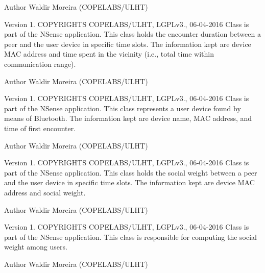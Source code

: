 \begin{DoxyAuthor}{Author}
Waldir Moreira (C\-O\-P\-E\-L\-A\-B\-S/\-U\-L\-H\-T)
\end{DoxyAuthor}
\begin{DoxyVersion}{Version}
1. C\-O\-P\-Y\-R\-I\-G\-H\-T\-S C\-O\-P\-E\-L\-A\-B\-S/\-U\-L\-H\-T, L\-G\-P\-Lv3., 06-\/04-\/2016 Class is part of the N\-Sense application. This class holds the encounter duration between a peer and the user device in specific time slots. The information kept are device M\-A\-C address and time spent in the vicinity (i.\-e., total time within communication range). 
\end{DoxyVersion}
\begin{DoxyAuthor}{Author}
Waldir Moreira (C\-O\-P\-E\-L\-A\-B\-S/\-U\-L\-H\-T)
\end{DoxyAuthor}
\begin{DoxyVersion}{Version}
1. C\-O\-P\-Y\-R\-I\-G\-H\-T\-S C\-O\-P\-E\-L\-A\-B\-S/\-U\-L\-H\-T, L\-G\-P\-Lv3., 06-\/04-\/2016 Class is part of the N\-Sense application. This class represents a user device found by means of Bluetooth. The information kept are device name, M\-A\-C address, and time of first encounter. 
\end{DoxyVersion}
\begin{DoxyAuthor}{Author}
Waldir Moreira (C\-O\-P\-E\-L\-A\-B\-S/\-U\-L\-H\-T)
\end{DoxyAuthor}
\begin{DoxyVersion}{Version}
1. C\-O\-P\-Y\-R\-I\-G\-H\-T\-S C\-O\-P\-E\-L\-A\-B\-S/\-U\-L\-H\-T, L\-G\-P\-Lv3., 06-\/04-\/2016 Class is part of the N\-Sense application. This class holds the social weight between a peer and the user device in specific time slots. The information kept are device M\-A\-C address and social weight. 
\end{DoxyVersion}
\begin{DoxyAuthor}{Author}
Waldir Moreira (C\-O\-P\-E\-L\-A\-B\-S/\-U\-L\-H\-T)
\end{DoxyAuthor}
\begin{DoxyVersion}{Version}
1. C\-O\-P\-Y\-R\-I\-G\-H\-T\-S C\-O\-P\-E\-L\-A\-B\-S/\-U\-L\-H\-T, L\-G\-P\-Lv3., 06-\/04-\/2016 Class is part of the N\-Sense application. This class is responsible for computing the social weight among users. 
\end{DoxyVersion}
\begin{DoxyAuthor}{Author}
Waldir Moreira (C\-O\-P\-E\-L\-A\-B\-S/\-U\-L\-H\-T) 
\end{DoxyAuthor}
